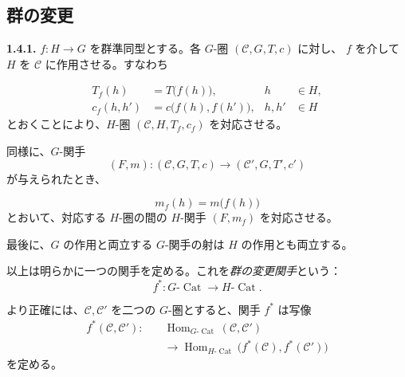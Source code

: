 \clearpage
{}%
\subsection{群の変更}

\noindent\textbf{1.4.1.}\quad
$f\colon H\to G$ を群準同型とする。各 $G$-圏 $(\mathcal C,G,T,c)$ に対し、
$f$ を介して $H$ を $\mathcal C$ に作用させる。すなわち

\begin{equation}
  \begin{aligned}
    T_f(h)&=T\bigl(f(h)\bigr),
      & h&\in H,\\
    c_f(h,h')&=c\bigl(f(h),f(h')\bigr),
      & h,h'&\in H
  \end{aligned}
  \tag{1.4.1.1}
\end{equation}
とおくことにより、$H$-圏 $(\mathcal C,H,T_f,c_f)$ を対応させる。

同様に、$G$-関手
\[
  (F,m)\colon(\mathcal C,G,T,c)
  \longrightarrow(\mathcal C',G,T',c')
\]
が与えられたとき、

\begin{equation}
  m_f(h)=m\bigl(f(h)\bigr)
  \tag{1.4.1.2}
\end{equation}
とおいて、対応する $H$-圏の間の $H$-関手 $(F,m_f)$ を対応させる。

最後に、$G$ の作用と両立する $G$-関手の射は $H$ の作用とも両立する。

以上は明らかに一つの関手を定める。これを\emph{群の変更関手}という：
\begin{equation}
  f^*\colon G\text{-}\operatorname{Cat}
  \longrightarrow H\text{-}\operatorname{Cat}.
  \tag{1.4.1.3}
\end{equation}

より正確には、$\mathcal C,\mathcal C'$ を二つの $G$-圏とすると、関手 $f^*$
は写像
\begin{equation}
  \begin{aligned}
    f^*(\mathcal C,\mathcal C')\colon\quad
      &\operatorname{Hom}_{G\text{-}\operatorname{Cat}}
        (\mathcal C,\mathcal C')\\
      &\longrightarrow
        \operatorname{Hom}_{H\text{-}\operatorname{Cat}}
        \bigl(f^*(\mathcal C),f^*(\mathcal C')\bigr)
  \end{aligned}
  \tag{1.4.1.4}
\end{equation}
を定める。

